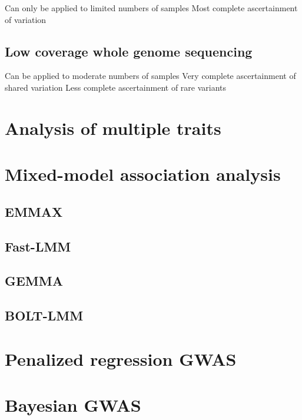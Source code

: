 \documentclass[]{book}
\theoremstyle{definition}
\theoremstyle{definition}
\theoremstyle{definition}
\theoremstyle{remark}
\begin{document}
Can only be applied to limited numbers of samples Most complete
ascertainment of variation

\subsection{Low coverage whole genome
sequencing}\label{low-coverage-whole-genome-sequencing}

Can be applied to moderate numbers of samples Very complete
ascertainment of shared variation Less complete ascertainment of rare
variants

\section{Analysis of multiple traits}\label{analysis-of-multiple-traits}

\section{Mixed-model association
analysis}\label{mixed-model-association-analysis}

\subsection{EMMAX}\label{emmax}

\subsection{Fast-LMM}\label{fast-lmm}

\subsection{GEMMA}\label{gemma}

\subsection{BOLT-LMM}\label{bolt-lmm}

\section{Penalized regression GWAS}\label{penalized-regression-gwas}

\section{Bayesian GWAS}\label{bayesian-gwas}
\end{document}
